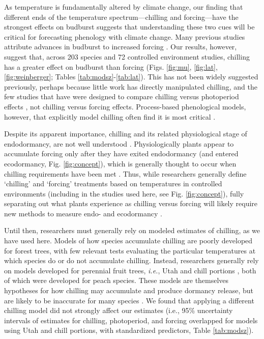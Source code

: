 \documentclass{article}
\begin{document}
\par As temperature is fundamentally altered by climate change, our finding that different ends of the temperature spectrum---chilling and forcing---have the strongest effects on budburst suggests that understanding these two cues will be critical for forecasting phenology with climate change. Many previous studies attribute advances in budburst to increased forcing \emph{\citep{menzel2006,harrington2015,Basler:2014aa,bradley1999}}. Our results, however, suggest that, across 203 species and 72 controlled environment studies, chilling has a greater effect on budburst than forcing (Figs. \ref{fig:mu}, \ref{fig:lat}, \ref{fig:weinberger}; Tables \ref{tab:modsz}-\ref{tab:lat}). This has not been widely suggested previously, perhaps because little work has directly manipulated chilling, and the few studies that have were designed to compare chilling versus photoperiod effects \emph{\citep[e.g.,][]{zohner2016,Basler:2014aa,Caffarra:2011qf,Laube:2014a}}, not chilling versus forcing effects. Process-based phenological models, however, that explicitly model chilling often find it is most critical \emph{\citep[e.g.,][]{gauzere2019}}. 
\par Despite its apparent importance, chilling and its related physiological stage of endodormancy, are not well understood \emph{\citep{chuine2016}}. Physiologically plants appear to accumulate forcing only after they have exited endodormancy (and entered ecodormancy, Fig. \ref{fig:concept}), which is generally thought to occur when chilling requirements have been met \emph{\citep{chuine2016}}. Thus, while researchers generally define `chilling' and `forcing' treatments based on temperatures in controlled environments (including in the studies used here, see Fig. \ref{fig:concept}), fully separating out what plants experience as chilling versus forcing will likely require new methods to measure endo- and ecodormancy \emph{\citep{vanderschoot2014}}. 

\par Until then, researchers must generally rely on modeled estimates of chilling, as we have used here. Models of how species accumulate chilling are poorly developed for forest trees, with few relevant tests evaluating the particular temperatures at which species do or do not accumulate chilling. Instead, researchers generally rely on models developed for perennial fruit trees, \emph{i.e.}, Utah \emph{\citep[Table \ref{tab:utah}][]{richardson1974}} and chill portions \emph{\citep{fishman1987}}, both of which were developed for peach species. These models are themselves hypotheses for how chilling may accumulate and produce dormancy release, but are likely to be inaccurate for many species \emph{\citep{dennis2003}}. We found that applying a different chilling model did not strongly affect our estimates (i.e., 95\% uncertainty intervals of estimates for chilling, photoperiod, and forcing overlapped for models using Utah and chill portions, with standardized predictors, Table \ref{tab:modsz}).
\end{document}
